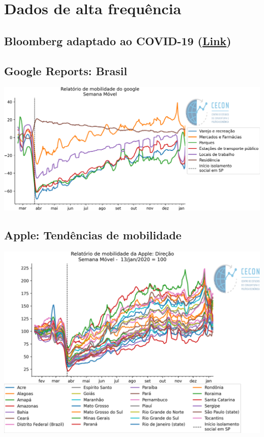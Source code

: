 \documentclass{SelfArx}
\begin{document}
\section*{Dados de alta frequência}
\label{sec:org28355b2}

\subsection*{Bloomberg adaptado ao COVID-19 (\href{https://www.bloomberg.com/news/articles/2020-11-13/alternative-data-show-activity-crashes-as-virus-resurges-chart}{Link})}
\label{sec:org87d6b67}

\subsection*{Google Reports: Brasil}
\label{sec:org7a761e5}

\begin{center}
\includegraphics[width=.9\linewidth]{./figs/Granulares/GoogleReport_Brasil.png}
\end{center}

\subsection*{Apple: Tendências de mobilidade}
\label{sec:org3f38a17}

\begin{center}
\includegraphics[width=.9\linewidth]{./figs/Granulares/AppleReport_Brasil.png}
\end{center}
\end{document}
